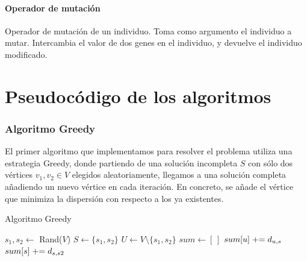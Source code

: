 \subsection{Operador de mutación}
\begin{algorithm}[H]
    \caption{Operador de mutación de un individuo. Toma como argumento el individuo a mutar. Intercambia el valor de dos genes en el individuo, y devuelve el individuo modificado.}
\begin{algorithmic}

\EndProcedure
\end{algorithmic}
\end{algorithm}

\part{Pseudocódigo de los algoritmos}



\section{Algoritmo Greedy}

El primer algoritmo que implementamos para resolver el problema utiliza una estrategia Greedy, donde partiendo de una solución incompleta $S$ con sólo dos vértices $v_1,v_2 \in V$ elegidos aleatoriamente, llegamos a una solución completa añadiendo un nuevo vértice en cada iteración. En concreto, se añade el vértice que minimiza la dispersión con respecto a los ya existentes.

\begin{algorithm}[H]
\caption{Algoritmo Greedy}
\begin{algorithmic}[1]
\State $s_1, s_2 \gets$ Rand($V$) 
\State $S \gets \{s_1,s_2\}$
\State $U \gets V \setminus \{s_1,s_2\}$  
\State 
\State $sum \gets [ \, ]$ 
 
        \State $sum[u] \mathrel{+}= d_{u,s}$
    \EndFor
\EndFor
{}
        \State $sum[s] \mathrel{+}= d_{s,s2}$
    \EndFor
\EndFor
{}
\end{algorithmic}
\end{algorithm}

